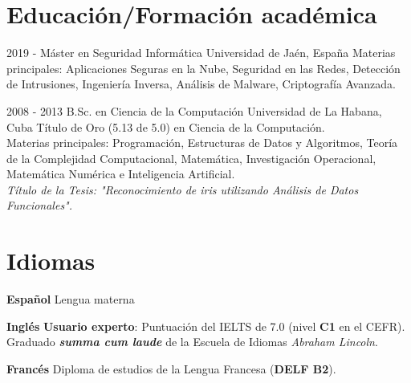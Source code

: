 \documentclass[]{friggeri-cv}
\begin{document}
\section{Educación/Formación académica}
\begin{entrylist}
  \entry
    {2019 - }
    {Máster en Seguridad Informática}
    {Universidad de Jaén, España}
    {
    	Materias principales: Aplicaciones Seguras en la Nube, Seguridad en las Redes, Detección de Intrusiones, Ingeniería Inversa, Análisis de Malware, Criptografía Avanzada.\\
    }

  \entry
    {2008 - 2013}
    {B.Sc. en Ciencia de la Computación}
    {Universidad de La Habana, Cuba}
    {Título de Oro (5.13 de 5.0) en Ciencia de la Computación.\\ Materias principales: Programación, Estructuras de Datos y Algoritmos, Teoría de la Complejidad Computacional, Matemática, Investigación Operacional, Matemática Numérica e Inteligencia Artificial.\\
    \emph{Título de la Tesis: "Reconocimiento de iris utilizando Análisis de Datos Funcionales".}}

\end{entrylist}

\section{Idiomas}
\begin{entrylist}
  \entry
    {\textbf{Español}}
    {}
    {}
    {Lengua materna}      

  \entry
    {\textbf{Inglés}}
    {}
    {}
    {
		\textbf{Usuario experto}: Puntuación del IELTS de 7.0 (nivel \textbf{C1} en el CEFR).\\    
    	Graduado \textbf{\emph{summa cum laude}} de la Escuela de Idiomas \emph{Abraham Lincoln}.
    }

  \entry
    {\textbf{Francés}}
    {}
    {}
    {Diploma de estudios de la Lengua Francesa (\textbf{DELF B2}).}
\end{entrylist}
\pagebreak
\end{document}
